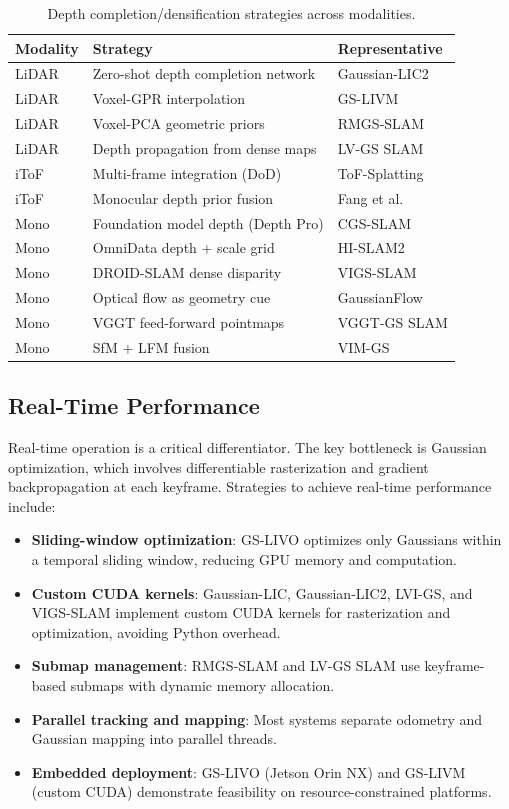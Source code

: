 \begin{table}[t]
\centering
\caption{Depth completion/densification strategies across modalities.}
\label{tab:depth_comp}
\scriptsize
\begin{tabular}{lll}
\toprule
\textbf{Modality} & \textbf{Strategy} & \textbf{Representative} \\
\midrule
LiDAR & Zero-shot depth completion network & Gaussian-LIC2 \\
LiDAR & Voxel-GPR interpolation & GS-LIVM \\
LiDAR & Voxel-PCA geometric priors & RMGS-SLAM \\
LiDAR & Depth propagation from dense maps & LV-GS SLAM \\
\midrule
iToF & Multi-frame integration (DoD) & ToF-Splatting \\
iToF & Monocular depth prior fusion & Fang et al. \\
\midrule
Mono & Foundation model depth (Depth Pro) & CGS-SLAM \\
Mono & OmniData depth + scale grid & HI-SLAM2 \\
Mono & DROID-SLAM dense disparity & VIGS-SLAM \\
Mono & Optical flow as geometry cue & GaussianFlow \\
Mono & VGGT feed-forward pointmaps & VGGT-GS SLAM \\
Mono & SfM + LFM fusion & VIM-GS \\
\bottomrule
\end{tabular}
\end{table}

\subsection{Real-Time Performance}

Real-time operation is a critical differentiator.  The key bottleneck is
Gaussian optimization, which involves differentiable rasterization and
gradient backpropagation at each keyframe.  Strategies to achieve real-time
performance include:

\begin{itemize}
    \item \textbf{Sliding-window optimization}: GS-LIVO optimizes only
    Gaussians within a temporal sliding window, reducing GPU memory and
    computation.
    \item \textbf{Custom CUDA kernels}: Gaussian-LIC, Gaussian-LIC2, LVI-GS,
    and VIGS-SLAM implement custom CUDA kernels for rasterization and
    optimization, avoiding Python overhead.
    \item \textbf{Submap management}: RMGS-SLAM and LV-GS SLAM use
    keyframe-based submaps with dynamic memory allocation.
    \item \textbf{Parallel tracking and mapping}: Most systems separate
    odometry and Gaussian mapping into parallel threads.
    \item \textbf{Embedded deployment}: GS-LIVO (Jetson Orin NX) and
    GS-LIVM (custom CUDA) demonstrate feasibility on resource-constrained
    platforms.
\end{itemize}

